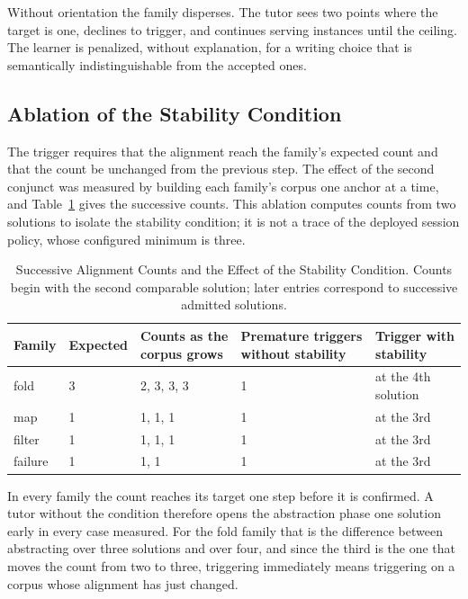 \documentclass[journal]{IEEEtran}
\begin{document}
Without orientation the family disperses. The tutor sees two points
where the target is one, declines to trigger, and continues serving
instances until the ceiling. The learner is penalized, without
explanation, for a writing choice that is semantically indistinguishable
from the accepted ones.

\subsection{Ablation of the Stability Condition}\label{sec:8.6}
The trigger requires that the alignment reach the family's expected
count and that the count be unchanged from the previous step. The effect
of the second conjunct was measured by building each family's corpus one
anchor at a time, and Table~\ref{tab:7} gives the successive counts.
This ablation computes counts from two solutions to isolate the stability
condition; it is not a trace of the deployed session policy, whose
configured minimum is three.

\begin{table}[t]
\centering\scriptsize\setlength{\tabcolsep}{3pt}
\caption{Successive Alignment Counts and the Effect of the Stability Condition. Counts begin with the second comparable solution; later entries correspond to successive admitted solutions.}\label{tab:7}
\begin{tabular}{@{}p{0.40in}p{0.46in}p{0.72in}p{0.78in}p{0.78in}@{}}
\toprule
Family & Expected & Counts as the corpus grows & Premature triggers without stability & Trigger with stability \\
\midrule
fold & 3 & 2, 3, 3, 3 & 1 & at the 4th solution \\
map & 1 & 1, 1, 1 & 1 & at the 3rd \\
filter & 1 & 1, 1, 1 & 1 & at the 3rd \\
failure & 1 & 1, 1 & 1 & at the 3rd \\
\bottomrule
\end{tabular}
\end{table}

In every family the count reaches its target one step before it is
confirmed. A tutor without the condition therefore opens the abstraction
phase one solution early in every case measured. For the fold family
that is the difference between abstracting over three solutions and over
four, and since the third is the one that moves the count from two to
three, triggering immediately means triggering on a corpus whose
alignment has just changed.
\end{document}
